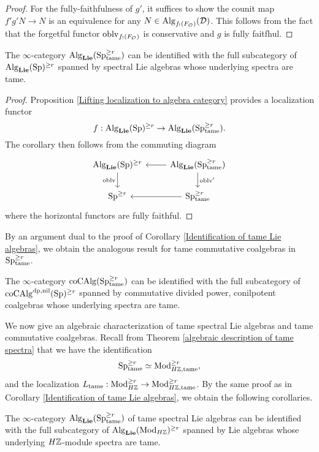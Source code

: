 \begin{proof}
    For the fully-faithfulness of $g'$, it suffices to show the counit map 
    $f'g'N \to N$ is an equivalence for any $N\in \operatorname{Alg}_{f_{!}(F_{\mathcal{O}})}({\mathcal{D}})$. This follows from the fact that the forgetful functor $\operatorname{oblv}_{f_{!}(F_{\mathcal{O}})}$ is conservative and $g$ is fully faitfhul.
\end{proof}

\begin{corollary}
\label{Identification of tame Lie algebras}
	The $\infty$-category $\operatorname{Alg}_{\mathbf{Lie}}(\operatorname{Sp}^{\geq r}_{\operatorname{\operatorname{tame}}})$ can be identified with the full subcategory of $\operatorname{Alg}_{\mathbf{Lie}}(\operatorname{Sp})^{\geq r}$ spanned by spectral Lie algebras whose underlying spectra are tame.
\end{corollary}
\begin{proof}
    Proposition \ref{Lifting localization to algebra category} provides a localization functor
	$$
	f: \operatorname{Alg}_{\mathbf{Lie}}(\operatorname{Sp})^{\geq r} \to \operatorname{Alg}_{\mathbf{Lie}}(\operatorname{Sp}^{\geq r}_{\operatorname{\operatorname{tame}}}).
	$$
	The corollary then follows from the commuting diagram
\[
\begin{tikzcd}
	\Alg_{\spLie}(\Sp)^{\geq r} & \Alg_{\spLie}(\Sp^{\geq r}_{\tame})\\
	\Sp^{\geq r}  & 
	\Sp^{\geq r}_{\tame}
	\arrow[from=1-2, to= 1-1]
	\arrow[from=1-1, to=2-1, "\oblv" left]
	\arrow[from=1-2, to=2-2, "\oblv'" ]
	\arrow[from=2-2, to= 2-1]
\end{tikzcd}
\]
where the horizontal functors are fully faithful. 

\end{proof}

By an argument dual to the proof of Corollary \ref{Identification of tame Lie algebras}, we obtain the analogous result for tame commutative coalgebras in $\operatorname{Sp}^{\geq r}_{\operatorname{\operatorname{tame}}}$. 
\begin{corollary}
\label{Identification of tame dp,nil coalgebras}
    The $\infty$-category $\operatorname{coCAlg}(\operatorname{Sp}^{\geq r}_{\operatorname{\operatorname{tame}}})$ can be identified with the full subcategory of $\operatorname{coCAlg}^{\operatorname{dp}, \operatorname{nil}}(\operatorname{Sp})^{\geq r}$ spanned by commutative divided power, conilpotent coalgebras whose underlying spectra are tame.
\end{corollary}

We now give an algebraic characterization of tame spectral Lie algebras and tame commutative coalgebras.
Recall from Theorem \ref{algebraic description of tame spectra} that we have the identification
$$
\operatorname{Sp}^{\geq r}_{\operatorname{\operatorname{tame}}} \simeq
\operatorname{Mod}_{H{\mathbb{Z}},\operatorname{\operatorname{tame}}}^{\geq r},
$$
and the localization $L_{\operatorname{\operatorname{tame}}}:\operatorname{Mod}_{H{\mathbb{Z}}}^{\geq r} \to \operatorname{Mod}_{H{\mathbb{Z}},\operatorname{\operatorname{tame}}}^{\geq r}$. By the same proof as in Corollary \ref{Identification of tame Lie algebras}, we obtain the following corollaries.
\begin{corollary}
\label{Identification of tame Lie algebras in Mod_HZ}
    The $\infty$-category $\operatorname{Alg}_{\mathbf{Lie}}(\operatorname{Sp}^{\geq r}_{\operatorname{\operatorname{tame}}})$ of tame spectral Lie algebras can be identified with the full subcategory of $\operatorname{Alg}_{\mathbf{Lie}}(\operatorname{Mod}_{H{\mathbb{Z}}})^{\geq r}$ spanned by Lie algebras whose underlying $H{\mathbb{Z}}$-module spectra are tame.
\end{corollary}

